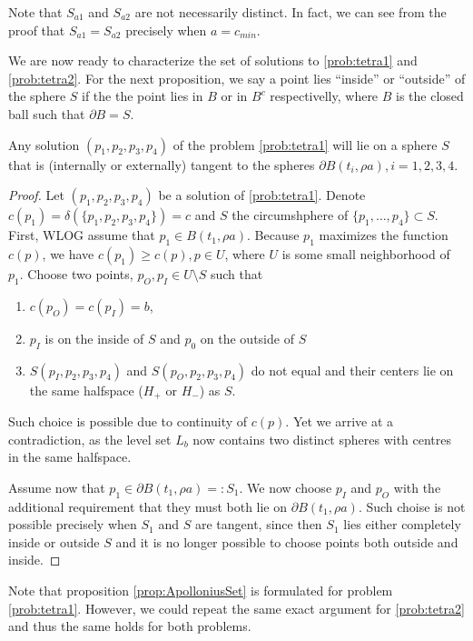 Note that $S_{a1}$ and $S_{a2}$ are not necessarily distinct. In fact, we can see from the proof that $S_{a1}=S_{a2}$ precisely when $a=c_{min}$.


We are now ready to characterize the set of solutions to \ref{prob:tetra1} and \ref{prob:tetra2}. For the next proposition, we say a point lies ``inside'' or ``outside'' of the sphere $S$ if the the point lies in $B$ or in $B^c$ respectivelly, where $B$ is the closed ball such that $\partial B = S$.


\begin{proposition}\label{prop:ApolloniusSet}
Any solution $(p_1,p_2,p_3,p_4)$ of the problem \ref{prob:tetra1} will lie on a sphere $S$ that is (internally or externally) tangent to the spheres $\partial B(t_i,\rho a), i =1,2,3,4$. 
\end{proposition}
\begin{proof}
	Let $(p_1,p_2,p_3,p_4)$ be a solution of \ref{prob:tetra1}. Denote $c(p_1)=\delta(\{p_1,p_2,p_3,p_4\})=c$ and $S$ the circumshphere of $\{p_1,\dots,p_4\}\subset S$. 
	First, WLOG assume that $p_1 \in B(t_1,\rho a)$. Because $p_1$ maximizes the function $c(p)$, we have $c(p_1)\geq c(p), p\in U$, where $U$ is some small neighborhood of $p_1$. Choose two points, $p_O,p_I\in U\setminus S$ such that 
\begin{enumerate} 
\item $c(p_O)=c(p_I)=b$,
\item $p_I$ is on the inside of $S$ and $p_0$ on the outside of $S$ 
\item {}$S(p_I,p_2,p_3,p_4)$ and $S(p_O,p_2,p_3,p_4)$ do not equal and their centers lie on the same halfspace ($H_+$ or $H_-$) as $S$. 
\end{enumerate}
Such choice is possible due to continuity of $c(p)$. Yet we arrive at a contradiction, as the level set $L_b$ now contains two distinct spheres with centres in the same halfspace. 

Assume now that $p_1 \in \partial B(t_1,\rho a)=: S_1$. We now choose $p_I$ and $p_O$ with the additional requirement that they must both lie on $\partial B(t_1,\rho a)$. Such choise is not possible precisely when $S_1$ and $S$ are tangent, since then  $S_1$ lies either completely inside or outside $S$ and it is no longer possible to choose points both outside and inside. 
\end{proof}
Note that proposition \ref{prop:ApolloniusSet} is formulated for problem \ref{prob:tetra1}. However, we could repeat the same exact argument for \ref{prob:tetra2} and thus the same holds for both problems.\newline

